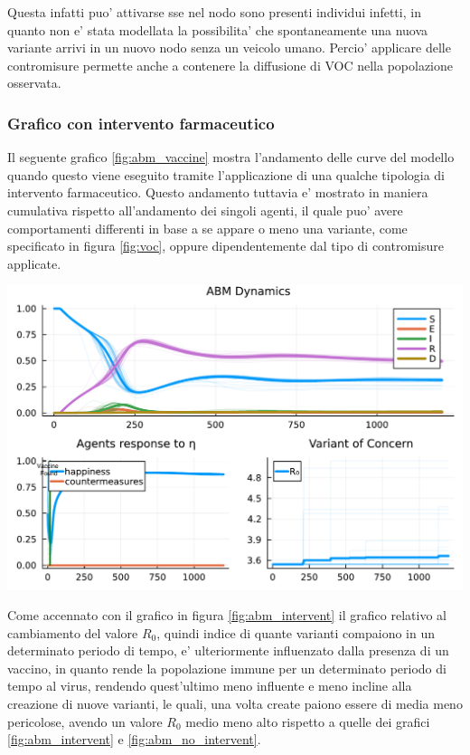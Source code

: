 Questa infatti puo' attivarse sse nel nodo sono presenti individui infetti, in quanto non e' stata modellata la 
possibilita' che spontaneamente una nuova variante arrivi in un nuovo nodo senza un veicolo umano. Percio' 
applicare delle contromisure permette anche a contenere la diffusione di VOC nella popolazione osservata.

\subsubsection*{Grafico con intervento farmaceutico}
Il seguente grafico \ref{fig:abm_vaccine} mostra l'andamento delle curve del modello
quando questo viene eseguito tramite l'applicazione di una qualche tipologia di intervento farmaceutico. 
Questo andamento tuttavia e' mostrato in maniera cumulativa rispetto all'andamento dei singoli agenti, 
il quale puo' avere comportamenti differenti in base a se appare o meno una variante, 
come specificato in figura \ref{fig:voc}, oppure dipendentemente dal tipo di contromisure applicate.

\begin{minipage}{\linewidth}
	\centering
	\includegraphics[width=\textwidth]{img/SocialNetworkABM_VACCINE.pdf}
	\label{fig:abm_vaccine}
\end{minipage}

Come accennato con il grafico in figura \ref{fig:abm_intervent} il grafico relativo al cambiamento 
del valore $R_0$, quindi indice di quante varianti compaiono in un determinato periodo di tempo, e' 
ulteriormente influenzato dalla presenza di un vaccino, in quanto rende la popolazione immune per
un determinato periodo di tempo al virus, rendendo quest'ultimo meno influente e meno incline alla
creazione di nuove varianti, le quali, una volta create paiono essere di media meno pericolose, avendo un 
valore $R_0$ medio meno alto rispetto a quelle dei grafici \ref{fig:abm_intervent} e \ref{fig:abm_no_intervent}.

